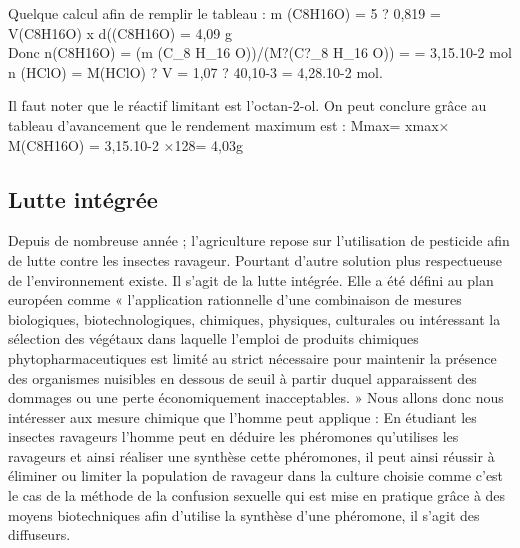 Quelque calcul afin de remplir le tableau : m (C8H16O) = 5 ? 0,819 =
V(C8H16O) x d((C8H16O) = 4,09 g\\Donc n(C8H16O) = (m (C\_8 H\_16
O))/(M?(C?\_8 H\_16 O)) = = 3,15.10-2 mol n (HClO) = M(HClO) ? V = 1,07
? 40,10-3 = 4,28.10-2 mol.

Il faut noter que le réactif limitant est l'octan-2-ol. On peut conclure
grâce au tableau d'avancement que le rendement maximum est : Mmax= xmax×
M(C8H16O) = 3,15.10-2 ×128= 4,03g

\subsection{Lutte intégrée}\label{lutte-intuxe9gruxe9e}

Depuis de nombreuse année ; l'agriculture repose sur l'utilisation de
pesticide afin de lutte contre les insectes ravageur. Pourtant d'autre
solution plus respectueuse de l'environnement existe. Il s'agit de la
lutte intégrée. Elle a été défini au plan européen comme « l'application
rationnelle d'une combinaison de mesures biologiques, biotechnologiques,
chimiques, physiques, culturales ou intéressant la sélection des
végétaux dans laquelle l'emploi de produits chimiques
phytopharmaceutiques est limité au strict nécessaire pour maintenir la
présence des organismes nuisibles en dessous de seuil à partir duquel
apparaissent des dommages ou une perte économiquement inacceptables. »
Nous allons donc nous intéresser aux mesure chimique que l'homme peut
applique : En étudiant les insectes ravageurs l'homme peut en déduire
les phéromones qu'utilises les ravageurs et ainsi réaliser une synthèse
cette phéromones, il peut ainsi réussir à éliminer ou limiter la
population de ravageur dans la culture choisie comme c'est le cas de la
méthode de la confusion sexuelle qui est mise en pratique grâce à des
moyens biotechniques afin d'utilise la synthèse d'une phéromone, il
s'agit des diffuseurs.

